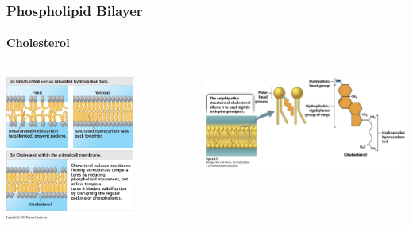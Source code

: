 \documentclass[10pt]{beamer}
\begin{document}
\begin{frame}[t]
\frametitle{Phospholipid Bilayer}
\framesubtitle{Cholesterol}
\vspace{0.5cm}

	\begin{columns}
		\begin{column}{0.5\textwidth}
			\begin{center}
				\includegraphics[width=0.7\textwidth]{figures/fg07_05.jpg}
			\end{center}
		\end{column}
		
		\begin{column}{0.5\textwidth}
			\begin{center}
				\includegraphics[width=1.0\textwidth]{figures/figure_05_05.jpg}
			\end{center}
		\end{column}
	\end{columns}	
\end{frame}
\end{document}
